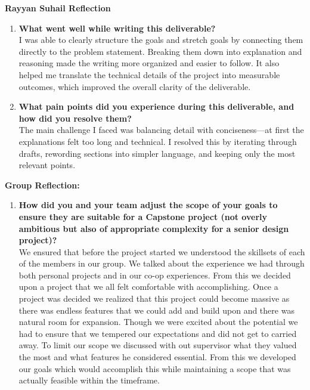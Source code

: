 \documentclass{article}
\begin{document}
\textbf{Rayyan Suhail Reflection}
\begin{enumerate}
    \item \textbf{What went well while writing this deliverable? } \\
    I was able to clearly structure the goals and stretch goals by connecting them directly to the problem statement. Breaking them down into explanation and reasoning made the writing more organized and easier to follow. It also helped me translate the technical details of the project into measurable outcomes, which improved the overall clarity of the deliverable.
    \item \textbf{What pain points did you experience during this deliverable, and how did you resolve them?} \\ 
    The main challenge I faced was balancing detail with conciseness—at first the explanations felt too long and technical. I resolved this by iterating through drafts, rewording sections into simpler language, and keeping only the most relevant points.
    
\end{enumerate} 

\textbf{Group Reflection:}
\begin{enumerate}
    \item \textbf{How did you and your team adjust the scope of your goals to ensure they are suitable for a Capstone project (not overly ambitious but also of appropriate complexity for a senior design project)?} \\
    We ensured that before the project started we understood the skillsets of each of the members in our group. We talked about the experience we had through both personal projects and in our co-op experiences. From this we decided upon a project that we all felt comfortable with accomplishing. Once a project was decided we realized that this project could become massive as there was endless features that we could add and build upon and there was natural room for expansion. Though we were excited about the potential we had to ensure that we tempered our expectations and did not get to carried away. To limit our scope we discussed with out supervisor what they valued the most and what features he considered essential. From this we developed our goals which would accomplish this while maintaining a scope that was actually feasible within the timeframe. 
\end{enumerate} 
\end{document}
